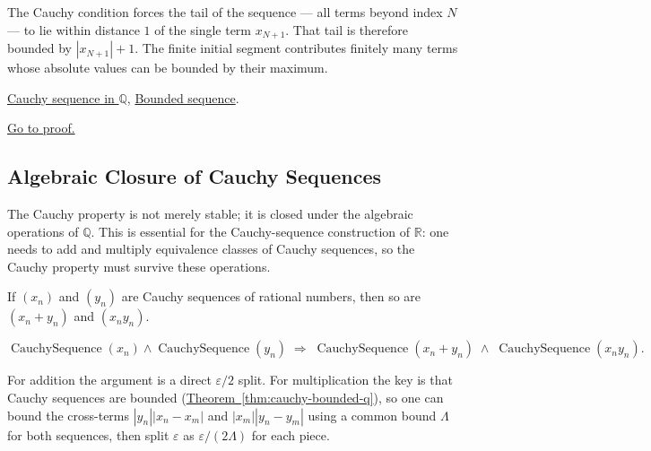 \begin{remark*}[Interpretation]
The Cauchy condition forces the tail of the sequence — all terms beyond
index $N$ — to lie within distance $1$ of the single term $x_{N+1}$.
That tail is therefore bounded by $|x_{N+1}| + 1$.  The finite initial
segment contributes finitely many terms whose absolute values can be
bounded by their maximum.
\end{remark*}

\begin{remark*}[Dependencies]
\hyperref[def:cauchy-rational]{Cauchy sequence in $\mathbb{Q}$},
\hyperref[def:bounded-sequence-q]{Bounded sequence}.
\end{remark*}

\begin{remark*}[Proof]
\hyperref[prf:cauchy-bounded-q]{Go to proof.}
\end{remark*}

\subsection{Algebraic Closure of Cauchy Sequences}
\label{subsec:cauchy-algebra-q}

\begin{remark}
The Cauchy property is not merely stable; it is closed under the algebraic
operations of $\mathbb{Q}$.  This is essential for the Cauchy-sequence
construction of $\mathbb{R}$: one needs to add and multiply equivalence
classes of Cauchy sequences, so the Cauchy property must survive these
operations.
\end{remark}

\begin{theorem}
\label{thm:cauchy-closed-operations-q}
If $(x_n)$ and $(y_n)$ are Cauchy sequences of rational numbers, then so
are $(x_n + y_n)$ and $(x_n y_n)$.
\end{theorem}

\begin{remark*}
\[
\operatorname{CauchySequence}(x_n) \land \operatorname{CauchySequence}(y_n)
\;\Longrightarrow\;
\operatorname{CauchySequence}(x_n + y_n)
\;\land\;
\operatorname{CauchySequence}(x_n y_n).
\]
\end{remark*}

\begin{remark*}[Interpretation]
For addition the argument is a direct $\varepsilon/2$ split.
For multiplication the key is that Cauchy sequences are bounded
(\hyperref[thm:cauchy-bounded-q]{Theorem~\ref*{thm:cauchy-bounded-q}}),
so one can bound the cross-terms $|y_n||x_n - x_m|$ and $|x_m||y_n - y_m|$
using a common bound $\Lambda$ for both sequences, then split $\varepsilon$
as $\varepsilon/(2\Lambda)$ for each piece.
\end{remark*}

